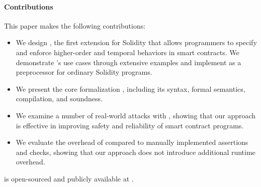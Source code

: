 \paragraph{Contributions} This paper makes the following contributions:
\begin{itemize}
  \item We design \lang, the first extension for Solidity that allows programmers to
        specify and enforce higher-order and temporal behaviors in smart contracts.
        We demonstrate \lang's use cases through extensive examples and
        implement \lang as a preprocessor for ordinary Solidity programs.
  \item We present the core formalization \lang, including its syntax, formal
        semantics, compilation, and soundness.
  \item We examine a number of real-world attacks with \lang, showing that our
        approach is effective in improving safety and reliability of smart contract
        programs.
  \item We evaluate the overhead of \lang compared to manually implemented
        assertions and checks, showing that our approach does not introduce
        additional runtime overhead.
\end{itemize}

\lang is open-sourced and publicly available at .

